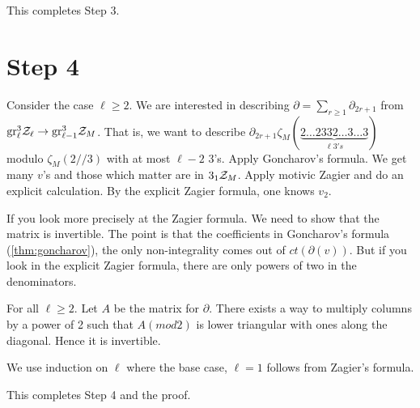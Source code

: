 This completes Step 3.

\section{Step 4}

Consider the case $\ell \geq 2$. We are interested in describing $\partial = \sum_{r \geq 1} \partial_{2r+1}$ from $\mathrm{gr}^3_{\ell} \mathcal{Z}_{\ell} \to \mathrm{gr}^3_{\ell-1} \mathcal{Z}_M$. That is, we want to describe $\partial_{2r+1} \zeta_M(\underbrace{2\ldots2332\ldots3\ldots3}_{\ell 3's})$ modulo $\zeta_M(2//3)$ with at most $\ell-2$ 3's. Apply Goncharov's formula. We get many $v$'s and those which matter are in $3_1 \mathcal{Z}_M$. Apply motivic Zagier and do an explicit calculation. By the explicit Zagier formula, one knows $v_2$.

If you look more precisely at the Zagier formula. We need to show that the matrix is invertible. The point is that the coefficients in Goncharov's formula (\ref{thm:goncharov}), the only non-integrality comes out of $ct(\partial(v))$. But if you look in the explicit Zagier formula, there are only powers of two in the denominators.

\begin{prop}
For all $\ell \geq 2$. Let $A$ be the matrix for $\partial$. There exists a way to multiply columns by a power of 2 such that $A(mod 2)$ is lower triangular with ones along the diagonal. Hence it is invertible.
\end{prop}
We use induction on $\ell$ where the base case, $\ell=1$ follows from Zagier's formula.

This completes Step 4 and the proof.
